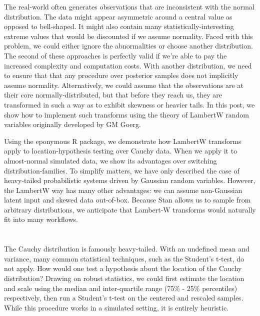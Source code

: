 \documentclass{article}
\begin{document}

The real-world often generates observations that are inconsistent with the normal distribution. The data might appear asymmetric around a central value as opposed to bell-shaped. It might also contain many statistically-interesting extreme values that would be discounted if we assume normality. Faced with this problem, we could either ignore the abnormalities or choose another distribution. The second of these approaches is perfectly valid if we're able to pay the increased complexity and computation costs. With another distribution, we need to ensure that that any procedure over posterior samples does not implicitly assume normality. Alternatively, we could assume that the observations are at their core normally-distributed, but that before they reach us, they are transformed in such a way as to exhibit skewness or heavier tails. In this post, we show how to implement such transforms using the theory of LambertW random variables originally developed by GM Goerg.


Using the eponymous R package, we demonstrate how LambertW transforms apply to location-hypothesis testing over Cauchy data. When we apply it to almost-normal simulated data, we show its advantages over switching distribution-families. To simplify matters, we have only described the case of heavy-tailed probabilistic systems driven by Gaussian random variables. However, the LambertW way has many other advantages: we can assume non-Gaussian latent input and skewed data out-of-box. Because Stan allows us to sample from arbitrary distributions, we anticipate that Lambert-W transforms would naturally fit into many workflows.

\section{}

The Cauchy distribution is famously heavy-tailed. With an undefined mean and variance, many common statistical techniques, such as the Student's t-test, do not apply. How would one test a hypothesis about the location of the Cauchy distribution? Drawing on robust statistics, we could first estimate the location and scale using the median and inter-quartile range (75\% - 25\% percentiles) respectively, then run a Student's t-test on the centered and rescaled samples. While this procedure works in a simulated setting, it is entirely heuristic.
\end{document}
